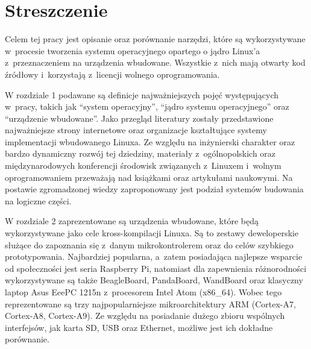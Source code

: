 \documentclass[printmode]{mgr}
\begin{document}











\listoffigures

\listoftables

\chapter*{Streszczenie}
Celem tej pracy jest opisanie oraz porównanie narzędzi, które są wykorzystywane w~procesie tworzenia systemu operacyjnego opartego o jądro Linux'a z~przeznaczeniem na urządzenia wbudowane.
Wszystkie z~nich mają otwarty kod źródłowy i~korzystają z~licencji wolnego oprogramowania.

W rozdziale 1 podawane są definicje najważniejszych pojęć występujących w~pracy, takich jak ``system operacyjny'', ``jądro systemu operacyjnego'' oraz ``urządzenie wbudowane''.
Jako przegląd literatury zostały przedstawione najważniejsze strony internetowe oraz organizacje kształtujące systemy implementacji wbudowanego Linuxa.
Ze względu na inżynierski charakter oraz bardzo dynamiczny rozwój tej dziedziny, materiały z~ogólnopolskich oraz międzynarodowych konferencji środowisk związanych z~Linuxem i~wolnym oprogramowaniem przeważają nad książkami oraz artykułami naukowymi.
Na postawie zgromadzonej wiedzy zaproponowany jest podział systemów budowania na logiczne części.

W rozdziale 2 zaprezentowane są urządzenia wbudowane, które będą wykorzystywane jako cele kross-kompilacji Linuxa.
Są to zestawy deweloperskie służące do zapoznania się z~danym mikrokontrolerem oraz do celów szybkiego prototypowania.
Najbardziej popularna, a~zatem posiadająca najlepsze wsparcie od społeczności jest seria Raspberry Pi, natomiast dla zapewnienia różnorodności wykorzystywane są także BeagleBoard, PandaBoard, WandBoard oraz klasyczny laptop Asus EeePC 1215n z~procesorem Intel Atom (x86\_64).
Wobec tego reprezentowane są trzy najpopularniejsze mikroarchitektury ARM (Cortex-A7, Cortex-A8, Cortex-A9).
Ze względu na posiadanie dużego zbioru wspólnych interfejsów, jak karta SD, USB oraz Ethernet, możliwe jest ich dokładne porównanie.
\end{document}
